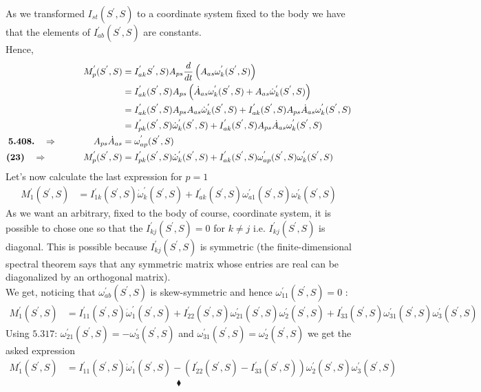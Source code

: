 As we transformed $I_{st}(S^{'},S)$ to a coordinate system fixed to the body we have that the elements of $I^{'}_{ab}(S^{'},S)$ are constants.\\
Hence,
\begin{align}
 M^{'}_p(S^{'},S) &=I^{'}_{ak}S^{'},S)A_{ps}\dv{}{t}\left( A_{as}\omega^{'}_{k}(S^{'},S)\right)\\
 &=I^{'}_{ak}(S^{'},S)A_{ps}\left(\dot{A}_{as}\omega^{'}_{k}(S^{'},S)+A_{as} \dot{\omega}^{'}_{k}(S^{'},S)\right)\\
 &=I^{'}_{ak}(S^{'},S)A_{ps}A_{as} \dot{\omega}^{'}_{k}(S^{'},S)+ I^{'}_{ak}(S^{'},S)A_{ps}\dot{A}_{as}\omega^{'}_{k}(S^{'},S)\\
 &=I^{'}_{pk}(S^{'},S) \dot{\omega}^{'}_{k}(S^{'},S)+ I^{'}_{ak}(S^{'},S)A_{ps}\dot{A}_{as}\omega^{'}_{k}(S^{'},S)\\
\textbf{5.408.}\quad\Rightarrow \quad\quad\quad\quad  A_{ps}\dot{A}_{as} &= \omega^{'}_{ap}(S^{'},S)\\
\textbf{(23)}\quad\Rightarrow \quad\quad\quad\quad  M^{'}_p(S^{'},S) &=I^{'}_{pk}(S^{'},S) \dot{\omega}^{'}_{k}(S^{'},S)+ I^{'}_{ak}(S^{'},S)\omega^{'}_{ap}(S^{'},S)\omega^{'}_{k}(S^{'},S)
\end{align}
Let's now calculate the last expression for $p=1$
\begin{align}
M^{'}_1(S^{'},S) &=I^{'}_{1k}(S^{'},S) \dot{\omega}^{'}_{k}(S^{'},S)+ I^{'}_{ak}(S^{'},S)\omega^{'}_{a1}(S^{'},S)\omega^{'}_{k}(S^{'},S)
\end{align}
As we want an arbitrary, fixed to the body of course, coordinate system, it is possible to chose one so that the $I^{'}_{kj}(S^{'},S) = 0 $ for $k\neq j$ i.e. $I^{'}_{kj}(S^{'},S) $ is diagonal. This is possible because $ I^{'}_{kj}(S^{'},S) $ is symmetric (the finite-dimensional spectral theorem says that any symmetric matrix whose entries are real can be diagonalized by an orthogonal matrix).\\
We get, noticing that $\omega^{'}_{ab}(S^{'},S)$ is skew-symmetric and hence $\omega^{'}_{11}(S^{'},S) = 0$ :
\begin{align}
M^{'}_1(S^{'},S) &= I^{'}_{11}(S^{'},S) \dot{\omega}^{'}_{1}(S^{'},S)+ I^{'}_{22}(S^{'},S)\omega^{'}_{21}(S^{'},S)\omega^{'}_{2}(S^{'},S)+ I^{'}_{33}(S^{'},S)\omega^{'}_{31}(S^{'},S)\omega^{'}_{3}(S^{'},S)
\end{align}
Using $\mathbf{5.317}$:  $\omega^{'}_{21}(S^{'},S)=-\omega^{'}_{3}(S^{'},S)$ and $\omega^{'}_{31}(S^{'},S)=\omega^{'}_{2}(S^{'},S)$  we get the asked expression 
\begin{align}
M^{'}_1(S^{'},S) &= I^{'}_{11}(S^{'},S) \dot{\omega}^{'}_{1}(S^{'},S)-\left( I^{'}_{22}(S^{'},S)- I^{'}_{33}(S^{'},S)\right)\omega^{'}_{2}(S^{'},S)\omega^{'}_{3}(S^{'},S)
\end{align}
$$\blacklozenge$$
\newpage


